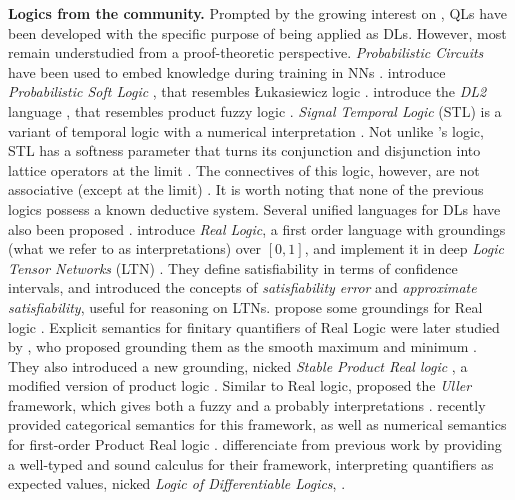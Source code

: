 \textbf{Logics from the \InAI{} community.} Prompted by the growing interest on \InAI{}, QLs have been developed with the specific purpose of being applied as DLs. However, most remain understudied from a proof-theoretic perspective. \emph{Probabilistic Circuits} have been used to embed knowledge during training in NNs \citep{NEURIPS2022_b6089408, braun2025tractablerepresentationlearningprobabilistic}. \citeauthor{kimmig2012short} introduce \emph{Probabilistic Soft Logic} \citep{kimmig2012short}, that resembles  Łukasiewicz logic \cite{cintula2011handbook,prooffuzzy}. \citeauthor{fischer2019dl2} introduce the \emph{DL2} language \citep{fischer2019dl2}, that resembles product fuzzy logic \citep{cintula2011handbook, prooffuzzy}. \emph{Signal Temporal Logic} (STL) is a variant of temporal logic with a numerical interpretation \citep{varnai2020robustness}. Not unlike \citeauthor{capucci2024quantifiers}'s logic, STL has a softness parameter that turns its conjunction and disjunction into lattice operators at the limit \citep{varnai2020robustness}. The connectives of this logic, however, are not associative (except at the limit) \citep{affeldt2024taming}. It is worth noting that none of the previous logics possess a known deductive system. Several unified languages for DLs have also been proposed \citep{badreddine2022logic, van2024uller, slusarz2023logic}. \citeauthor{serafini2016logic} introduce \emph{Real Logic}, a first order language with groundings (what we refer to as interpretations) over $[0,1]$, and implement it in deep \emph{Logic Tensor Networks} (LTN) \cite{badreddine2022logic}.   
They define satisfiability in terms of confidence intervals, and introduced the concepts of \emph{satisfiability error} and \emph{approximate satisfiability}, useful for reasoning on LTNs.  \citeauthor{van2022analyzing} propose some groundings for Real logic \citep{van2022analyzing}. Explicit semantics for finitary quantifiers of Real Logic were later studied by \citeauthor{badreddine2022logic}, who proposed grounding them as the smooth maximum and minimum \citep{badreddine2022logic}. They also introduced a new grounding, nicked \emph{Stable Product Real logic} \citep{badreddine2022logic}, 
a modified version of product logic \citep{van2022analyzing}. Similar to Real logic, \citeauthor{van2024uller} proposed the \emph{Uller} framework, which gives both a fuzzy and a probably interpretations \citep{van2022analyzing}. \citeauthor{schellhorn2025muller} recently provided categorical semantics for this framework, as well as numerical semantics for first-order Product Real logic \citep{schellhorn2025muller}. \citeauthor{slusarz2023logic} differenciate from previous work by providing a well-typed and sound calculus for their framework, interpreting quantifiers as expected values, nicked \emph{Logic of Differentiable Logics},  \citep{slusarz2023logic}. 

